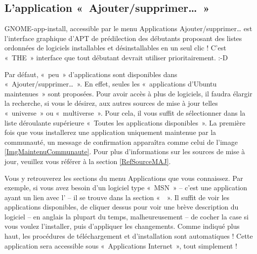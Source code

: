 {\subsection{L'application «~Ajouter/supprimer\dots{}~»}
\label{RefInstallAjouterSupprimer}
GNOME-app-install, accessible par le menu Applications \FlecheDroite Ajouter/\IndicCesure{}supprimer\dots{} est l'interface graphique d'APT de prédilection des débutants proposant des listes ordonnées de logiciels installables et désinstallables en un seul clic ! C'est «~THE~» interface que tout débutant devrait utiliser prioritairement. :-D
\begin{nota}
Par défaut, «~peu~» d'applications sont disponibles dans «~Ajouter/supprimer\dots{}~». En effet, seules les «~applications d'Ubuntu maintenues~» sont proposées. Pour avoir accès à plus de logiciels, il faudra élargir la recherche, si vous le désirez, aux autres sources de mise à jour telles «~universe~» ou «~multiverse~». Pour cela, il vous suffit de sélectionner dans la liste déroulante supérieure «~Toutes les applications disponibles~». La première fois que vous installerez une application uniquement maintenue par la communauté, un message de confirmation apparaîtra comme celui de l'image \ref{ImgMaintenuCommunaute}. Pour plus d'informations sur les sources de mise à jour, veuillez vous référer à la section \ref{RefSourceMAJ}.
\end{nota}
Vous y retrouverez les sections du menu Applications que vous connaissez. Par exemple, si vous avez besoin d'un logiciel type «~MSN~» -- c'est une application ayant un lien avec l' -- il se trouve dans la section «~~». Il suffit de voir les applications disponibles, de cliquer dessus pour voir une brève description du logiciel -- en anglais la plupart du temps, malheureusement -- de cocher la case si vous voulez l'installer, puis d'appliquer les changements. Comme indiqué plus haut, les procédures de téléchargement et d'installation sont automatiques ! Cette application sera accessible sous «~Applications \FlecheDroite Internet~», tout simplement !\par
}
